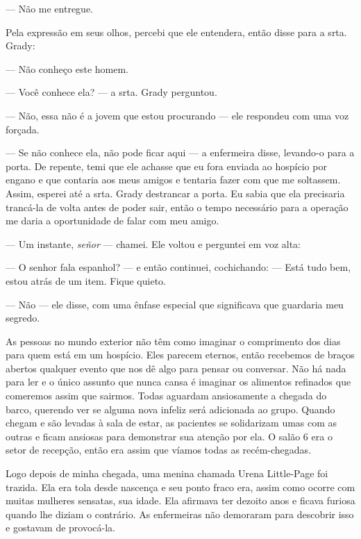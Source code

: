 --- Não me entregue.

Pela expressão em seus olhos, percebi que ele entendera, então disse
para a srta. Grady:

--- Não conheço este homem.

--- Você conhece ela? --- a srta. Grady perguntou.

--- Não, essa não é a jovem que estou procurando --- ele respondeu com
uma voz forçada.

--- Se não conhece ela, não pode ficar aqui --- a enfermeira disse,
levando-o para a porta. De repente, temi que ele achasse que eu fora
enviada ao hospício por engano e que contaria aos meus amigos e tentaria
fazer com que me soltassem. Assim, esperei até a srta. Grady destrancar
a porta. Eu sabia que ela precisaria trancá-la de volta antes de poder
sair, então o tempo necessário para a operação me daria a oportunidade
de falar com meu amigo.

--- Um instante, \emph{señor} --- chamei. Ele voltou
e perguntei em voz alta:

--- O senhor fala espanhol? --- e então continuei, cochichando: --- Está
tudo bem, estou atrás de um item. Fique quieto. 

--- Não --- ele disse, com uma ênfase especial que significava que guardaria meu segredo.

As pessoas no mundo exterior não têm como imaginar o comprimento dos
dias para quem está em um hospício. Eles parecem eternos, então
recebemos de braços abertos qualquer evento que nos dê algo para pensar
ou conversar. Não há nada para ler e o único assunto que nunca cansa é
imaginar os alimentos refinados que comeremos assim que sairmos. Todas
aguardam ansiosamente a chegada do barco, querendo ver se alguma nova
infeliz será adicionada ao grupo. Quando chegam e são levadas à sala de
estar, as pacientes se solidarizam umas com as outras e ficam
ansiosas para demonstrar sua atenção por ela. O salão 6 era o setor de recepção,
então era assim que víamos todas as recém-chegadas.

Logo depois de minha chegada, uma menina chamada Urena Little-Page foi
trazida. Ela era tola desde nascença e seu ponto fraco era, assim como
ocorre com muitas mulheres sensatas, sua idade. Ela afirmava ter dezoito
anos e ficava furiosa quando lhe diziam o contrário. As enfermeiras não
demoraram para descobrir isso e gostavam de provocá-la.

